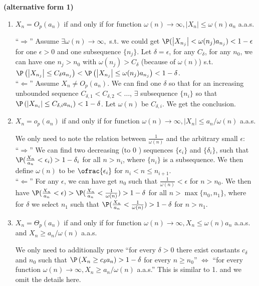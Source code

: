 \documentclass{article}
\newcommand{\bfs}[1]{\textbf{({#1}) }}
\begin{document}
\begin{rema}{\bfs{alternative form 1}}\label{rema:alt}
\begin{enumerate}
    \item $X_{n}=O_{p}\left(a_{n}\right)$ if and only if for 
     function $\omega(n) \rightarrow \infty,\left|X_{n}\right| \leq \omega(n) a_{n}$ a.a.s.
    
    ``$\Rightarrow$'' Assume $\exists \omega(n) \rightarrow \infty,$ s.t. we could get $\P(\left|X_{n_j}\right| < \omega(n_j) a_{n_j})<1-\epsilon$ for one $\epsilon>0$ and one subsequence $\{n_j\}$. Let $\delta=\epsilon$, for any $C_{\delta}$, for any $n_{0}$, we can have one $n_j>n_0$ with $\omega(n_j)>C_{\delta}$ (because of $\omega(n)$)  s.t. $\P \left(\left|X_{n_j}\right| \leq  C_{\delta} a_{n_j}\right)<\P \left(\left|X_{n_j}\right| \leq \omega(n_j) a_{n_j}\right)<1-\delta$.\\
    ``$\Leftarrow$'' Assume $X_{n}\ne O_{p}\left(a_{n}\right)$. We can find one $\delta$ so that for an increasing unbounded sequence $C_{\delta,1}<C_{\delta,2}<\ldots$, $\exists$ subsequence $\{n_i\}$ so that $\P \left(\left|X_{n_i}\right| \leq C_{\delta,i} a_{n_i}\right)<1-\delta$. Let $\omega(n)$ be $C_{\delta,i}$. We get the conclusion.
    
    \item  $X_{n}=o_{p}\left(a_{n}\right)$ if and only if for  function $\omega(n) \rightarrow \infty,\left|X_{n}\right| \leq a_{n} / \omega(n)$ a.a.s.
    
    We only need to note the relation between $\frac{1}{\omega(n)}$ and the arbitrary small $\epsilon$:\\
    ``$\Rightarrow$'' We can find two decreasing (to $0$ ) sequences $\{\epsilon_i\}$ and $\{\delta_i\}$, such that $\P(\frac{X_n}{a_n}<\epsilon_i)>1-\delta_i$ for all $n>n_i$, where $\{n_i\}$ is a subsequence. We then define $\omega(n)$ to be $\ofrac{\epsilon_i}$ for $n_i<n\le n_{i+1}$.\\
     ``$\Leftarrow$'' For any $\epsilon$, we can have get $n_0$ such that $\frac{1}{\omega(n)}<\epsilon$ for $n>n_0$. We then have $\P(\frac{X_n}{a_n}<\epsilon)>\P(\frac{X_n}{a_n}<\frac{1}{\omega(n)})>1-\delta$ for all $n>\max\{n_0,n_1\}$, where for $\delta$ we select $n_1$ such that  $\P(\frac{X_n}{a_n}<\frac{1}{\omega(n)})>1-\delta$ for $n>n_1$.
     
     \item $X_{n}=\Theta_{p}\left(a_{n}\right)$ if and only if for 
     function $\omega(n) \rightarrow \infty,X_{n} \leq \omega(n) a_{n}$ a.a.s. and $X_{n}\geq a_{n}/\omega(n) $ a.a.s.
    
    We only need to additionally prove ``for every $\delta>0$ there exist constants $c_{\delta}$ and $n_{0}$ such that $\P \left(X_{n} \geq c_{\delta} a_{n}\right)>1-\delta$ for every $n \geq n_{0}$'' $\Leftrightarrow$ ``for every function $\omega(n) \rightarrow \infty,X_{n}\geq a_{n}/\omega(n) $ a.a.s.'' This is similar to 1. and we omit the details here.
    
\end{enumerate}
\end{rema}
\end{document}

